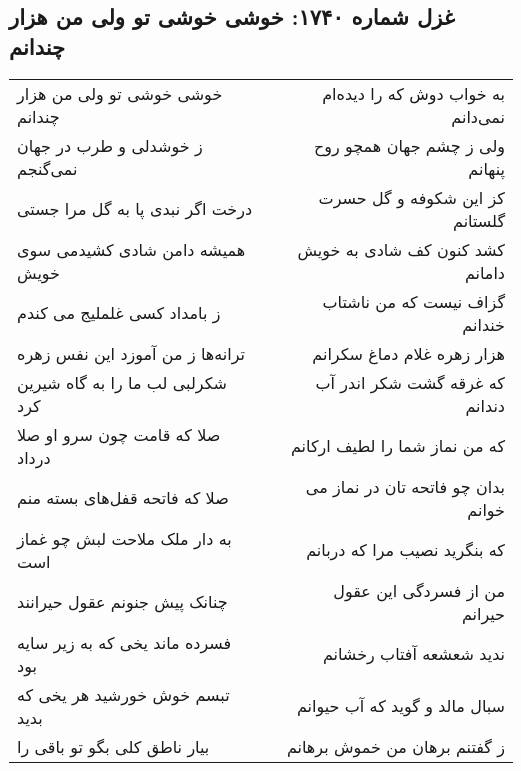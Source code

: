 \begin{center}
\section*{غزل شماره ۱۷۴۰: خوشی خوشی تو ولی من هزار چندانم}
\label{sec:1740}
\begin{longtable}{l p{0.5cm} r}
خوشی خوشی تو ولی من هزار چندانم
&&
به خواب دوش که را دیده‌ام نمی‌دانم
\\
ز خوشدلی و طرب در جهان نمی‌گنجم
&&
ولی ز چشم جهان همچو روح پنهانم
\\
درخت اگر نبدی پا به گل مرا جستی
&&
کز این شکوفه و گل حسرت گلستانم
\\
همیشه دامن شادی کشیدمی سوی خویش
&&
کشد کنون کف شادی به خویش دامانم
\\
ز بامداد کسی غلملیج می کندم
&&
گزاف نیست که من ناشتاب خندانم
\\
ترانه‌ها ز من آموزد این نفس زهره
&&
هزار زهره غلام دماغ سکرانم
\\
شکرلبی لب ما را به گاه شیرین کرد
&&
که غرقه گشت شکر اندر آب دندانم
\\
صلا که قامت چون سرو او صلا درداد
&&
که من نماز شما را لطیف ارکانم
\\
صلا که فاتحه قفل‌های بسته منم
&&
بدان چو فاتحه تان در نماز می خوانم
\\
به دار ملک ملاحت لبش چو غماز است
&&
که بنگرید نصیب مرا که دربانم
\\
چنانک پیش جنونم عقول حیرانند
&&
من از فسردگی این عقول حیرانم
\\
فسرده ماند یخی که به زیر سایه بود
&&
ندید شعشعه آفتاب رخشانم
\\
تبسم خوش خورشید هر یخی که بدید
&&
سبال مالد و گوید که آب حیوانم
\\
بیار ناطق کلی بگو تو باقی را
&&
ز گفتنم برهان من خموش برهانم
\\
\end{longtable}
\end{center}
